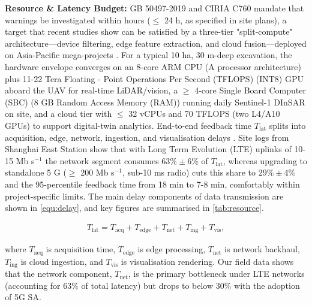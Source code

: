 \documentclass[preprint,11pt,authoryear,3p]{elsarticle}
\begin{document}
\textbf{Resource \& Latency Budget:} GB 50497-2019 and CIRIA C760 mandate that warnings be investigated within hours ($\le$ 24 h, as specified in site plans), a target that recent studies show can be satisfied by a three-tier "split-compute" architecture—device filtering, edge feature extraction, and cloud fusion—deployed on Asia-Pacific mega-projects \citep{Shi2016FogPrimer}. For a typical 10 ha, 30 m-deep excavation, the hardware envelope converges on an 8-core ARM CPU (A processor architecture) plus 11-22 Tera Floating - Point Operations Per Second (TFLOPS) (INT8) GPU aboard the UAV for real-time LiDAR/vision, a $\ge$ 4-core Single Board Computer (SBC) (8 GB Random Access Memory (RAM)) running daily Sentinel-1 DInSAR on site, and a cloud tier with $\le$ 32 vCPUs and 70 TFLOPS (two L4/A10 GPUs) to support digital-twin analytics. End-to-end feedback time $T_{\text{lat}}$ splits into acquisition, edge, network, ingestion, and visualisation delays \citep{JetsonXavier,EdgeAwareUAV}. Site logs from Shanghai East Station show that with Long Term Evolution (LTE) uplinks of 10-15 Mb s$^{-1}$ the network segment consumes $63\%\pm6\%$ of $T_{\text{lat}}$, whereas upgrading to standalone 5 G ($\ge$ 200 Mb s$^{-1}$, sub-10 ms radio) cuts this share to $29\%\pm4\%$ and the 95-percentile feedback time from 18 min to 7-8 min, comfortably within project-specific limits. The main delay components of data transmission are shown in \autoref{equ:delay}, and key figures are summarised in \autoref{tab:resource}.

\begin{align}\label{equ:delay}
  T_{\text{lat}}
  = T_{\text{acq}} + T_{\text{edge}} + T_{\text{net}}
  + T_{\text{ing}} + T_{\text{vis}},
\end{align}

where $T_{\text{acq}}$ is acquisition time, $T_{\text{edge}}$ is edge processing, $T_{\text{net}}$ is network backhaul, $T_{\text{ing}}$ is cloud ingestion, and $T_{\text{vis}}$ is visualisation rendering. Our field data shows that the network component, $T_{\text{net}}$, is the primary bottleneck under LTE networks (accounting for 63\% of total latency) but drops to below 30\% with the adoption of 5G SA.
\end{document}
